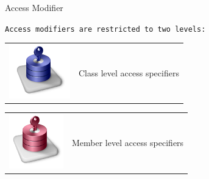 \documentclass[14pt]{beamer}
\begin{document}
\begin{frame}{Access Modifier}

 \texttt{Access modifiers are restricted to two levels:}
 
 \begin{tabular}{l l}
\begin{minipage}{0.1\textwidth}
\includegraphics[scale=.4]{class-level-access-specifier.png}
\end{minipage}
&
\begin{minipage}{0.85\textwidth}
Class level access specifiers
\end{minipage}
\end{tabular}
 
\begin{tabular}{l l}
\begin{minipage}{0.1\textwidth}
\includegraphics[scale=.4]{member-level-access-specifier.png}
\end{minipage}
&
\begin{minipage}{0.85\textwidth}
Member level access specifiers
\end{minipage}
\end{tabular} 
\end{frame}
\end{document}
